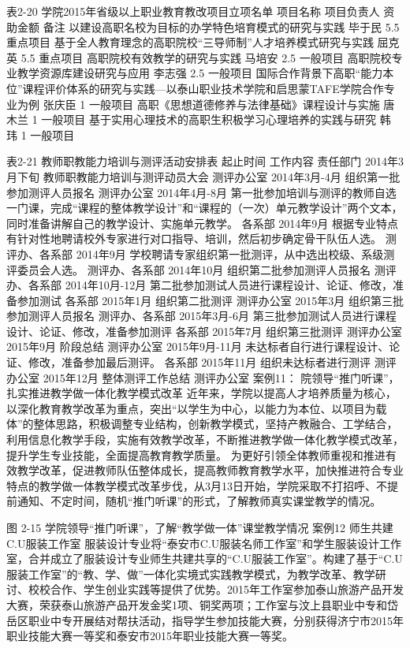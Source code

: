 表2-20 学院2015年省级以上职业教育教改项目立项名单
项目名称
项目负责人
资助金额
备注
以建设高职名校为目标的办学特色培育模式的研究与实践
毕于民
5.5
重点项目
基于全人教育理念的高职院校“三导师制”人才培养模式研究与实践
屈克英
5.5
重点项目
高职院校有效教学的研究与实践
马培安
2.5
一般项目
高职院校专业教学资源库建设研究与应用
李志强
2.5
一般项目
国际合作背景下高职“能力本位”课程评价体系的研究与实践—以泰山职业技术学院和启思蒙TAFE学院合作专业为例
张庆臣
1
一般项目
高职《思想道德修养与法律基础》课程设计与实施
唐木兰
1
一般项目
基于实用心理技术的高职生积极学习心理培养的实践与研究
韩  玮
1
一般项目

表2-21  教师职教能力培训与测评活动安排表
起止时间
工作内容
责任部门
2014年3月下旬
教师职教能力培训与测评动员大会
测评办公室
2014年3月-4月
组织第一批参加测评人员报名
测评办公室
2014年4月-8月
第一批参加培训与测评的教师自选一门课，完成“课程的整体教学设计”和“课程的（一次）单元教学设计”两个文本，同时准备讲解自己的教学设计、实施单元教学。
各系部
2014年9月
根据专业特点有针对性地聘请校外专家进行对口指导、培训，然后初步确定骨干队伍人选。
测评办、各系部
2014年9月
学校聘请专家组织第一批测评，从中选出校级、系级测评委员会人选。
测评办、各系部
2014年10月
组织第二批参加测评人员报名
测评办、各系部
2014年10月-12月
第二批参加测试人员进行课程设计、论证、修改，准备参加测试
各系部
2015年1月
组织第二批测评
测评办公室
2015年3月
组织第三批参加测评人员报名
测评办、各系部
2015年3月-6月
第三批参加测试人员进行课程设计、论证、修改，准备参加测评
各系部
2015年7月
组织第三批测评
测评办公室
2015年9月
阶段总结
测评办公室
2015年9月-11月
未达标者自行进行课程设计、论证、修改，准备参加最后测评。
各系部
2015年11月
组织未达标者进行测评
测评办公室
2015年12月
整体测评工作总结
测评办公室
案例11： 院领导“推门听课”，扎实推进教学做一体化教学模式改革
近年来，学院以提高人才培养质量为核心，以深化教育教学改革为重点，突出“以学生为中心，以能力为本位、以项目为载体”的整体思路，积极调整专业结构，创新教学模式，坚持产教融合、工学结合，利用信息化教学手段，实施有效教学改革，不断推进教学做一体化教学模式改革，提升学生专业技能，全面提高教育教学质量。
为更好引领全体教师重视和推进有效教学改革，促进教师队伍整体成长，提高教师教育教学水平，加快推进符合专业特点的教学做一体教学模式改革步伐，从3月13日开始，学院采取不打招呼、不提前通知、不定时间，随机“推门听课”的形式，了解教师真实课堂教学的情况。





图 2-15 学院领导“推门听课”，了解“教学做一体”课堂教学情况
案例12  师生共建C.U服装工作室
服装设计专业将“泰安市C.U服装名师工作室”和学生服装设计工作室，合并成立了服装设计专业师生共建共享的“C.U服装工作室”。构建了基于“C.U服装工作室”的“教、学、做”一体化实境式实践教学模式，为教学改革、教学研讨、校校合作、学生创业实践等提供了优势。2015年工作室参加泰山旅游产品开发大赛，荣获泰山旅游产品开发金奖1项、铜奖两项；工作室与汶上县职业中专和岱岳区职业中专开展结对帮扶活动，指导学生参加技能大赛，分别获得济宁市2015年职业技能大赛一等奖和泰安市2015年职业技能大赛一等奖。

